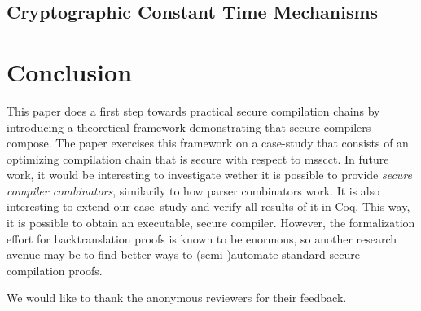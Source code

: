 \documentclass[utf8,acmsmall,review,screen,dvipsnames]{acmart}
\begin{document}
\subsection{Cryptographic Constant Time Mechanisms}\label{subsec:relw:cctmechs}

\section{Conclusion}\label{sec:concl}

This paper does a first step towards practical secure compilation chains by introducing a theoretical framework demonstrating that secure compilers compose.
The paper exercises this framework on a case-study that consists of an optimizing compilation chain that is secure with respect to \gls{msscct}.
In future work, it would be interesting to investigate wether it is possible to provide {\em secure compiler combinators}, similarily to how parser combinators work.
It is also interesting to extend our case--study and verify all results of it in Coq.
This way, it is possible to obtain an executable, secure compiler.
However, the formalization effort for backtranslation proofs is known to be enormous, so another research avenue may be to find better ways to (semi-)automate standard secure compilation proofs.

\begin{acks}
  We would like to thank the anonymous reviewers for their feedback.
\end{acks}




\appendix
\end{document}
